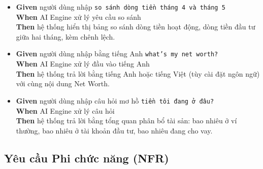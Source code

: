 \begin{itemize}
\item \textbf{Given} người dùng nhập \texttt{so sánh dòng tiền tháng 4 và tháng 5}  \\ \hspace*{1.5em}  \textbf{When} AI Engine xử lý yêu cầu so sánh  \\ \hspace*{1.5em}  \textbf{Then} hệ thống hiển thị bảng so sánh dòng tiền hoạt động, dòng tiền đầu tư giữa hai tháng, kèm chênh lệch.
\item \textbf{Given} người dùng nhập bằng tiếng Anh \texttt{what's my net worth?}  \\ \hspace*{1.5em}  \textbf{When} AI Engine xử lý đầu vào tiếng Anh  \\ \hspace*{1.5em}  \textbf{Then} hệ thống trả lời bằng tiếng Anh hoặc tiếng Việt (tùy cài đặt ngôn ngữ) với cùng nội dung Net Worth.
\item \textbf{Given} người dùng nhập câu hỏi mơ hồ \texttt{tiền tôi đang ở đâu?}  \\ \hspace*{1.5em}  \textbf{When} AI Engine xử lý câu hỏi  \\ \hspace*{1.5em}  \textbf{Then} hệ thống trả lời bằng tổng quan phân bổ tài sản: bao nhiêu ở ví thường, bao nhiêu ở tài khoản đầu tư, bao nhiêu đang cho vay.
\end{itemize}
\subsection{Yêu cầu Phi chức năng (NFR)}

